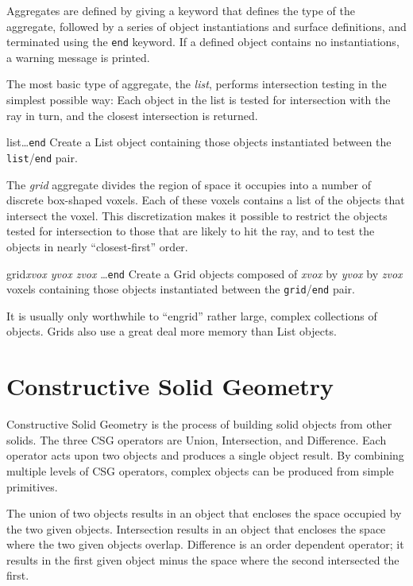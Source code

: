 Aggregates are defined by giving a keyword that defines the
type of the aggregate, followed by
a series of object instantiations and
surface definitions, and terminated using the {\tt end} keyword.
If a defined object contains no instantiations, a warning message
is printed.

The most basic type of aggregate, the {\em list}, performs
intersection testing in the simplest possible way:  Each object in the
list is tested for intersection with the ray in turn, and the closest
intersection is returned.

\begin{defkey}{list}{\ldots {\tt end}}
	Create a List object containing those objects instantiated between
	the {\tt list}/{\tt end} pair.
\end{defkey}

The {\em grid} aggregate
divides the region of space it occupies into a number of discrete
box-shaped
voxels.  Each of these voxels contains a list of the objects that
intersect the voxel.  This discretization makes it possible to
restrict the objects
tested for intersection to those that are likely to hit the ray,
and to test
the objects in nearly ``closest-first'' order.

\begin{defkey}{grid}{{\em xvox yvox zvox} \ldots {\tt end}}
	Create a Grid objects composed of {\em xvox} by {\em yvox} by
	{\em zvox} voxels containing those objects
	instantiated between the {\tt grid}/{\tt end} pair.
\end{defkey}
It is usually only worthwhile to ``engrid'' rather large,
complex collections of objects.  Grids also use a great deal more
memory than List objects.

\section {Constructive Solid Geometry}

Constructive Solid Geometry is
the process of building solid objects from other solids.
The three CSG
operators are Union, Intersection, and Difference.  Each operator
acts upon two objects and produces a single object result.
By combining multiple levels of CSG operators, complex
objects can be produced from simple primitives.

The union of two objects results in an
object that encloses the space occupied by the two given objects.
Intersection results in an object that encloses the space where the two
given objects overlap.  Difference is an order dependent operator; it
results in the
first given object minus the space where the second intersected
the first.

